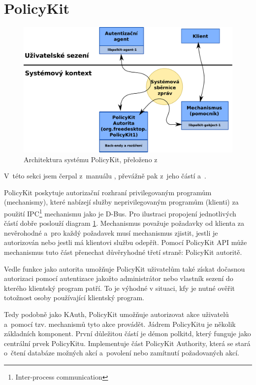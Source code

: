 \section{PolicyKit}
\begin{figure}[h]
    \centering
    \includegraphics[width=12cm]{obrazky/polkit-architecture-vector-cz.pdf}
    \caption{Architektura systému PolicyKit, přeloženo z~\cite{manpolkit1}}
    \label{fig:polkit_arch}
\end{figure}

V~této sekci jsem čerpal z~manuálu \cite{manpolkit_overview}, převážně pak z~jeho částí \cite{manpolkit1} a~\cite{manpklocalauth}.

PolicyKit poskytuje autorizační rozhraní privilegovaným programům (mechanismy), které nabízejí služby neprivilegovaným programům (klienti) za použití IPC\footnote{Inter-process communication} mechanismu jako je D-Bus. Pro ilustraci propojení jednotlivých částí dobře poslouží diagram \ref{fig:polkit_arch}. Mechanismus považuje požadavky od klienta za nevěrohodné a~pro každý požadavek musí mechanismus zjistit, jestli je autorizován nebo jestli má klientovi službu odepřít. Pomocí PolicyKit API může mechanismus tuto část přenechat důvěryhodné třetí straně: PolicyKit autoritě.\cite{manpolkit1}

Vedle funkce jako autorita umožňuje PolicyKit uživatelům také získat dočasnou autorizaci pomocí autentizace jakožto administrátor nebo vlastník sezení do kterého klientský program patří. To je výhodné v situaci, kfy je nutné ověřit totožnost osoby používající klientský program.\cite{manpolkit1}

Tedy podobně jako KAuth, PolicyKit umožňuje autorizovat akce uživatelů a~pomocí tzv. mechanismů tyto akce provádět. Jádrem PolicyKitu je několik základních komponent. První důležitou částí je démon polkitd, který funguje jako centrální prvek PolicyKitu. Implementuje část PolicyKit Authority, která se stará o~čtení databáze možných akcí a~povolení nebo zamítnutí požadovaných akcí.

